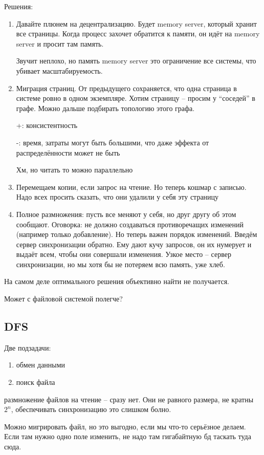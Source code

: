 \documentclass{book}
\theoremstyle{definition}
\begin{document}
Решения:
\begin{enumerate}
    \item Давайте плюнем на децентрализацию. Будет memory server, который хранит все страницы. Когда процесс захочет обратится к памяти, он идёт на memory server и просит там память.

        Звучит неплохо, но память memory server это ограничение все системы, что убивает масштабируемость.
    \item Миграция страниц. От предыдущего сохраняется, что одна страница в системе ровно в одном экземпляре. Хотим страницу -- просим у ``соседей'' в графе. Можно дальше подбирать топологию этого графа.

        +: консистентность

        -: время, затраты могут быть большими, что даже эффекта от распределённости может не быть

        Хм, но читать то можно параллельно
    \item Перемещаем копии, если запрос на чтение. Но теперь кошмар с записью. Надо всех просить сказать, что они удалили у себя эту страницу
    \item Полное размножения: пусть все меняют у себя, но друг другу об этом сообщают. Оговорка: не должно создаваться противоречащих изменений (например только добавление). Но теперь важен порядок изменений. Введём  сервер синхронизации обратно. Ему дают кучу запросов, он их нумерует и выдаёт всем, чтобы они совершали изменения. Узкое место -- сервер синхронизации, но мы хотя бы не потеряем всю память, уже хлеб.
\end{enumerate}

На самом деле оптимального решения объективно найти не получается.

Может с файловой  системой полегче?

\subsection{DFS}

Две подзадачи:
\begin{enumerate}
    \item обмен данными
    \item поиск файла
\end{enumerate}

размножение файлов на чтение -- сразу нет. Они не равного размера, не кратны $2^n$, обеспечивать синхронизацию это слишком болно.

Можно мигрировать файл, но это выгодно, если мы что-то серьёзное делаем. Если там нужно одно поле изменить, не надо там гигабайтную бд таскать туда сюда.
\end{document}
